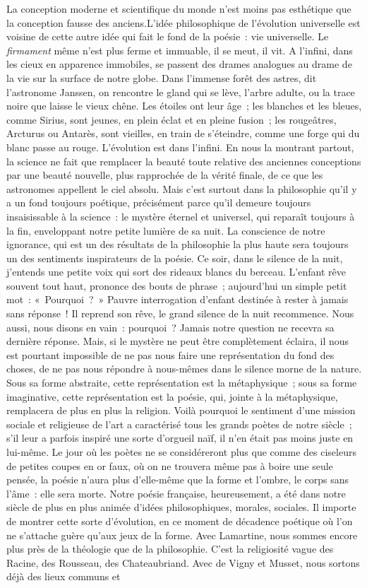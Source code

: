 \documentclass[french,twoside]{book} %
\begin{document}
La conception moderne et scientifique du monde n’est moins pas esthétique que la conception fausse des anciens.L’idée philosophique de l’évolution universelle est voisine de cette autre idée qui fait le fond de la poésie : vie universelle. Le \emph{firmament} même n’est plus ferme et immuable, il se meut, il vit. A l’infini, dans les cieux en apparence immobiles, se passent des drames analogues au drame de la vie sur la surface de notre globe. Dans l’immense forêt des astres, dit l’astronome Janssen, on rencontre le gland qui se lève, l’arbre adulte, ou la trace noire que laisse le vieux chêne. Les étoiles ont leur âge ; les blanches et les bleues, comme Sirius, sont jeunes, en plein éclat et en pleine fusion ; les rougeâtres, Arcturus ou Antarès, sont vieilles, en train de s’éteindre, comme une forge qui du blanc passe au rouge. L’évolution est dans l’infini. En nous la montrant partout, la science ne fait que remplacer la beauté toute relative des anciennes conceptions par une beauté nouvelle, plus rapprochée de la vérité finale, de ce que les astronomes appellent le ciel absolu. Mais c’est surtout dans la philosophie qu’il y a un fond toujours poétique, précisément parce qu’il demeure toujours insaisissable à la science : le mystère éternel et universel, qui reparaît toujours à la fin, enveloppant notre petite lumière de sa nuit. La conscience de notre ignorance, qui est un des résultats de la philosophie la plus haute sera toujours un des sentiments inspirateurs de la poésie. Ce soir, dans le silence de la nuit, j’entends une petite voix qui sort des rideaux blancs du berceau. L’enfant rêve souvent tout haut, prononce des bouts de phrase ; aujourd’hui un simple petit mot : « Pourquoi ? » Pauvre interrogation d’enfant destinée à rester à jamais sans réponse ! Il reprend son rêve, le grand silence de la nuit recommence. Nous aussi, nous disons en vain : pourquoi ? Jamais notre question ne recevra sa dernière réponse. Mais, si le mystère ne peut être complètement éclaira, il nous est pourtant impossible de ne pas nous faire une représentation du fond des choses, de ne pas nous répondre à nous-mêmes dans le silence morne de la nature. Sous sa forme abstraite, cette représentation est la métaphysique ; sous sa forme imaginative, cette représentation est la poésie, qui, jointe à la métaphysique, remplacera de plus en plus la religion. Voilà pourquoi le sentiment d’une mission sociale et religieuse de l’art a caractérisé tous les grands poètes de notre siècle ; s’il leur a parfois inspiré une sorte d’orgueil naïf, il n’en était pas moins juste en lui-même. Le jour où les poètes ne se considéreront plus que comme des ciseleurs de petites coupes en or faux, où on ne trouvera même pas à boire une seule pensée, la poésie n’aura plus d’elle-même que la forme et l’ombre, le corps sans l’âme : elle sera morte. Notre poésie française, heureusement, a été dans notre siècle de plus en plus animée d’idées philosophiques, morales, sociales. Il importe de montrer cette sorte d’évolution, en ce moment de décadence poétique où l’on ne s’attache guère qu’aux jeux de la forme. Avec Lamartine, nous sommes encore plus près de la théologie que de la philosophie. C’est la religiosité vague des Racine, des Rousseau, des Chateaubriand. Avec de Vigny et Musset, nous sortons déjà des lieux communs et 
\end{document}
